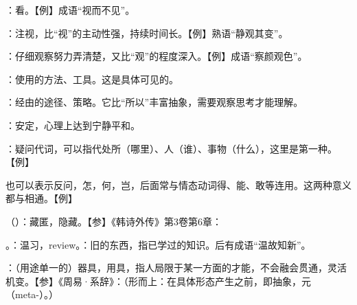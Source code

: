{
\item {}：看。【例】成语“视而不见”。

：注视，比“视”的主动性强，持续时间长。【例】熟语“静观其变”。

：仔细观察努力弄清楚，又比“观”的程度深入。【例】成语“察颜观色”。
\item {}：使用的方法、工具。这是具体可见的。

：经由的途径、策略。它比“所以”丰富抽象，需要观察思考才能理解。%

：安定，心理上达到宁静平和。

\item {}：疑问代词，可以指代处所（哪里）、人（谁）、事物（什么），这里是第一种。【例】  

也可以表示反问，怎，何，岂，后面常与情态动词得、能、敢等连用。这两种意义都与相通。【例】   %
\item {}（）：藏匿，隐藏。【参】《韩诗外传》第3卷第6章：
}
{}


{
\item {}。：温习，review。：旧的东西，指已学过的知识。后有成语“温故知新”。
}
{}  %


{
\item {}：（用途单一的）器具，用具，指人局限于某一方面的才能，不会融会贯通，灵活机变。【参】《周易·系辞》：（形而上：在具体形态产生之前，即抽象，元（meta-）。）
}
{}  %


